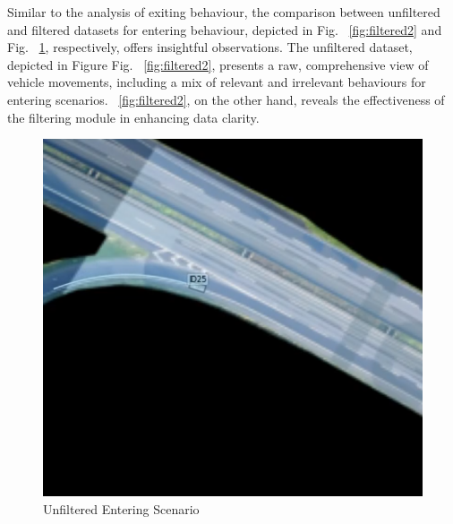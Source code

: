 Similar to the analysis of exiting behaviour, the comparison between unfiltered and filtered datasets for entering behaviour, depicted in Fig. ~\ref{fig:filtered2} and Fig. ~\ref{fig:unfiltered2}, respectively, offers insightful observations. The unfiltered dataset, depicted in Figure Fig. ~\ref{fig:filtered2}, presents a raw, comprehensive view of vehicle movements, including a mix of relevant and irrelevant behaviours for entering scenarios. ~\ref{fig:filtered2}, on the other hand, reveals the effectiveness of the filtering module in enhancing data clarity.

\begin{figure}[htbp]
    \centering
    \begin{minipage}[b]{0.45\columnwidth}
        \centering
        \includegraphics[width=\columnwidth]{images/figures/Filtering3.png}
        \caption{Unfiltered Entering Scenario}
        \label{fig:unfiltered2}
    \end{minipage}
    \hfill
    \begin{minipage}[b]{0.45\columnwidth}
        \centering

\end{minipage}
\end{figure}
